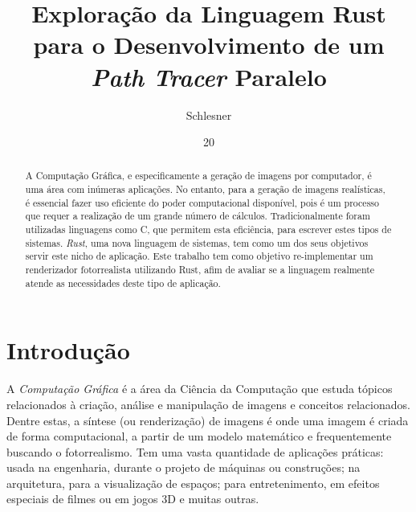 \documentclass[tg]{mdtufsm}
\title{Exploração da Linguagem Rust para o Desenvolvimento de um \emph{Path Tracer} Paralelo}
\author{Schlesner}{Yuri Kunde}
\institute{Centro de Tecnologia}
\date{20}{Outubro}{2014}
\def\Cpp{{C\nolinebreak[4]\raisebox{.20ex}{\small\bf++}}}
\begin{document}
\maketitle
\makeapprove

\begin{abstract}
A Computação Gráfica, e especificamente a geração de imagens por computador, é uma área com
inúmeras aplicações. No entanto, para a geração de imagens realísticas, é essencial fazer
uso eficiente do poder computacional disponível, pois é um processo que requer a realização
de um grande número de cálculos. Tradicionalmente foram utilizadas linguagens como \Cpp, que
permitem esta eficiência, para escrever estes tipos de sistemas. \emph{Rust}, uma nova
linguagem de sistemas, tem como um dos seus objetivos servir este nicho de aplicação. Este
trabalho tem como objetivo re-implementar um renderizador fotorrealista utilizando Rust,
afim de avaliar se a linguagem realmente atende as necessidades deste tipo de aplicação.
\end{abstract}

\tableofcontents

\setlength{\baselineskip}{1.5\baselineskip}


\chapter{Introdução}

A \emph{Computação Gráfica} é a área da Ciência da Computação que estuda tópicos relacionados à
criação, análise e manipulação de imagens e conceitos relacionados. Dentre estas, a síntese (ou
renderização) de imagens é onde uma imagem é criada de forma computacional, a partir de um modelo
matemático e frequentemente buscando o fotorrealismo. Tem uma vasta quantidade de aplicações
práticas: usada na engenharia, durante o projeto de máquinas ou construções; na arquitetura, para
a visualização de espaços; para entretenimento, em efeitos especiais de filmes ou em jogos 3D e
muitas outras.
\end{document}

